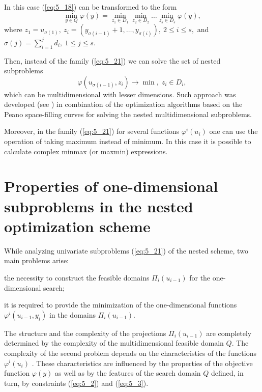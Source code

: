 In this case (\ref{eq:5_18}) can be transformed to the form
\begin{displaymath}
\min_{y\in Q}\varphi(y)=\min_{z_1\in D_1}\min_{z_2\in D_2}\ldots\min_{z_s\in D_s}\varphi(y),
\end{displaymath}
where $z_1=u_{\sigma(1)},\:z_i=(y_{\sigma{(i-1)}}+1,\ldots, y_{\sigma(i)}),\:2\leq i\leq s,$ and $\sigma(j)=\sum_{i=1}^j{d_i},\:1\leq j\leq s$.

Then, instead of the family (\ref{eq:5_21}) we can solve the set of nested subproblems 
\begin{displaymath}
\varphi(u_{\sigma(i-1)},z_i)\rightarrow \min,\;z_i\in D_i,
\end{displaymath}
which can be multidimensional with lesser dimensions. Such approach was developed (see \cite{5_BarkGer2014, 5_BarkGerLeb, 5_BarkLeb, 5_SysoyevBarkGerLeb}) in combination of the optimization algorithms based on the Peano space-filling curves for solving the nested multidimensional subproblems.

Moreover, in the family (\ref{eq:5_21}) for several functions $\varphi^i(u_i)$ one can use the operation of taking maximum instead of minimum. In this case it is possible to calculate complex minmax (or maxmin) expressions. 

\section{Properties of one-dimensional subproblems in the nested optimization scheme}
\label{sec:5_2}
While analyzing univariate subproblems (\ref{eq:5_21}) of the nested scheme, two main problems arise:
\begin{description} [a)]
\item [a)] {the necessity to construct the feasible domains $\Pi_i(u_{i-1})$  for the one-dimensional search;}
\item [b)] {it is required to provide the minimization of the one-dimensional functions $\varphi^i(u_{i-1},y_i)$  in the domains  $\Pi_i(u_{i-1})$.}
\end{description}

The structure and the complexity of the projections $\Pi_i(u_{i-1})$  are completely determined by the complexity of the multidimensional feasible domain $Q$. The complexity of the second problem depends on the characteristics of the functions $\varphi^i(u_i)$ . These characteristics are influenced by the properties of the objective function $\varphi(y)$ as well as by the features of the search domain $Q$ defined, in turn, by constraints (\ref{eq:5_2}) and (\ref{eq:5_3}).

